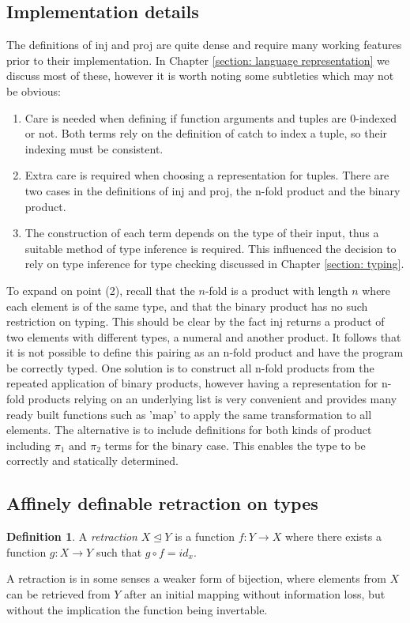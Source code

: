 \documentclass[12pt,a4paper]{report}
\theoremstyle{definition}
\newtheorem{definition}{Definition}[chapter]%
\theoremstyle{remark}
\begin{document}
\subsection{Implementation details}
The definitions of inj and proj are quite dense and require many working features prior to their implementation. In Chapter \ref{section: language representation} we discuss most of these, however it is worth noting some subtleties which may not be obvious:
\begin{enumerate}
    \item Care is needed when defining if function arguments and tuples are 0-indexed or not. Both terms rely on the definition of catch to index a tuple, so their indexing must be consistent.
    \item Extra care is required when choosing a representation for tuples. There are two cases in the definitions of inj and proj, the n-fold product and the binary product. 
    \item The construction of each term depends on the type of their input, thus a suitable method of type inference is required. This influenced the decision to rely on type inference for type checking discussed in Chapter \ref{section: typing}.
\end{enumerate}

To expand on point (2), recall that the $n$-fold is a product with length $n$ where each element is of the same type, and that the binary product has no such restriction on typing. This should be clear by the fact inj returns a product of two elements with different types, a numeral and another product. It follows that it is not possible to define this pairing as an n-fold product and have the program be correctly typed. One solution is to construct all n-fold products from the repeated application of binary products, however having a representation for n-fold products relying on an underlying list is very convenient and provides many ready built functions such as 'map' to apply the same transformation to all elements. The alternative is to include definitions for both kinds of product including $\pi_1 \text{ and } \pi_2$ terms for the binary case. This enables the type to be correctly and statically determined. 

\subsection{Affinely definable retraction on types}
\begin{definition}
    A \emph{retraction} $X \trianglelefteq Y$ is a function $f: Y \rightarrow X$ where there exists a function $g: X \rightarrow Y$ such that $g \circ f = id_x$. 
    
    A retraction is in some senses a weaker form of bijection, where elements from $X$ can be retrieved from $Y$ after an initial mapping without information loss, but without the implication the function being invertable.
\end{definition}
\end{document}
